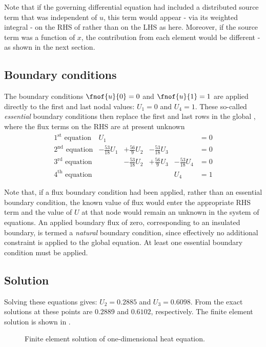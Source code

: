 Note that if the governing differential equation had included a distributed 
source term that was independent of $u$, this term would appear - via its 
weighted integral - on the RHS of  rather than on the LHS
as here. Moreover, if the source term was a function of $x$, the contribution 
from each element would be different - as shown in the next section.

\subsection{Boundary conditions}

The boundary conditions
$\fnof{u}{0}=0$ and $\fnof{u}{1}=1$ are applied directly to the first and last
nodal values: \ie $U_{1}=0$ and $U_{4}=1$.  These so-called \emph{essential}
boundary conditions then replace the first and last rows in the global
, where the flux terms on the RHS are at present
unknown
\begin{equation*}
  \begin{array}{lrrrrl}
    \mbox{$1^{\text{st}}$ equation} & U_{1} & & & & = 0 \\ 
    \mbox{$2^{\text{nd}}$ equation} & -\frac{53}{18}U_{1} & +\frac{56}{9}U_{2}
    & -\frac{53}{18}U_{3} & & = 0 \\
    \mbox{$3^{\text{rd}}$ equation}& & -\frac{53}{18}U_{2} & +\frac{56}{9}U_{3}
    & -\frac{53}{18}U_{4} &= 0 \\
    \mbox{$4^{\text{th}}$ equation}& & & & U_{4} & =1
  \end{array}
\end{equation*}

Note that, if a flux boundary condition had been applied, rather than an 
essential boundary condition, the known value of flux would enter the 
appropriate RHS term and the value of $U$ at that node would remain an unknown 
in the system of equations. An applied boundary flux of zero, corresponding to 
an insulated boundary, is termed a \emph{natural} boundary condition, since 
effectively no additional constraint is applied to the global equation. At
least one essential boundary condition must be applied.

\subsection{Solution}
 
Solving these equations gives: $U_{2} = 0.2885$ and $U_{3} = 0.6098$.  From
 the exact solutions at these points are $0.2889$ and
 $0.6102$, respectively. The finite element solution is shown in
.
\begin{figure} \centering
  
  \caption{Finite element solution of one-dimensional heat equation.}
  \label{fig:f.e.soln}
\end{figure}

